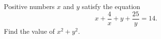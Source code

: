 Positive numbers $x$ and $y$ satisfy the equation \[x+\dfrac{4}{x}+y+\dfrac{25}{y}=14.\]Find the value of $x^{2}+y^{2}$.
